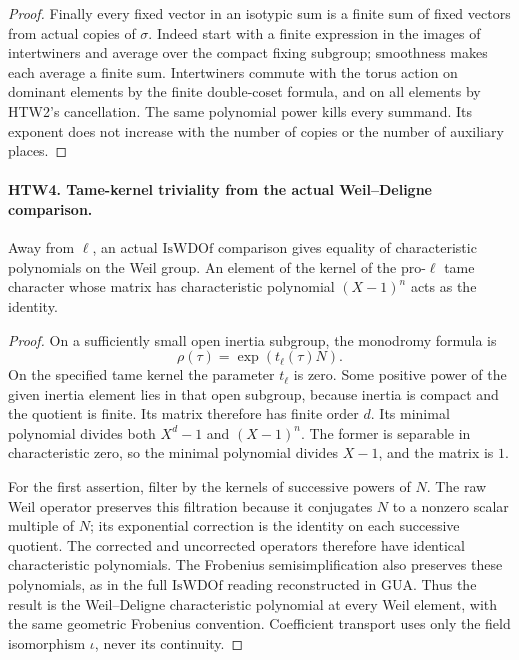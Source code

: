 \begin{proof}
Finally every fixed vector in an isotypic sum is a finite
sum of fixed vectors from actual copies of \(\sigma\).
Indeed start with a finite expression in the images of
intertwiners and average over the compact fixing subgroup;
smoothness makes each average a finite sum.  Intertwiners
commute with the torus action on dominant elements by the
finite double-coset formula, and on all elements by
HTW2's cancellation.  The same polynomial power kills
every summand.  Its exponent does not increase with the
number of copies or the number of auxiliary places.
\end{proof}

\paragraph{HTW4. Tame-kernel triviality from the actual Weil--Deligne comparison.}
\label{claim:HTW4}
Away from \(\ell\), an actual \(\mathrm{IsWDOf}\) comparison
gives equality of characteristic polynomials on the Weil
group.  An element of the kernel of the pro-\(\ell\) tame
character whose matrix has characteristic polynomial
\((X-1)^n\) acts as the identity.
\begin{proof}
On a sufficiently small open inertia subgroup, the
monodromy formula is
\[
                  \rho(\tau)=\exp(t_\ell(\tau)N).
\]
On the
specified tame kernel the parameter \(t_\ell\) is zero.
Some positive power of the given inertia element lies in
that open subgroup, because inertia is compact and the
quotient is finite.  Its matrix therefore has finite
order \(d\).  Its minimal polynomial divides both
\(X^d-1\) and \((X-1)^n\).  The former is separable in
characteristic zero, so the minimal polynomial divides
\(X-1\), and the matrix is \(1\).

For the first assertion, filter by the kernels of
successive powers of \(N\).  The raw Weil operator
preserves this filtration because it conjugates \(N\)
to a nonzero scalar multiple of \(N\); its exponential
correction is the identity on each successive quotient.
The corrected and uncorrected operators therefore
have identical characteristic polynomials.  The
Frobenius semisimplification also preserves these
polynomials, as in the full \(\mathrm{IsWDOf}\)
reading reconstructed in GUA.  Thus the result is the
Weil--Deligne characteristic polynomial at every Weil
element, with the same geometric Frobenius convention.
Coefficient transport uses only the field isomorphism
\(\iota\), never its continuity.
\end{proof}

